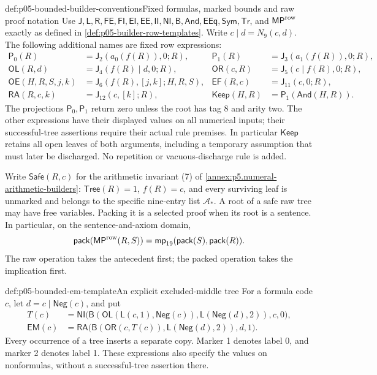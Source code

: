 \begin{hbdefinition}{def:p05-bounded-builder-conventions}{Fixed formulas, marked bounds and raw proof notation}
Use \(\mathsf J,\mathsf L,\mathsf R,\mathsf{FE},\mathsf{FI},
\mathsf{EI},\mathsf{EE},\mathsf{II},\mathsf{NI},\mathsf B,
\mathsf{And},\mathsf{EEq},\mathsf{Sym},\mathsf{Tr}\), and
\(\mathsf{MP}^{\rm row}\) exactly as defined in
\cref{def:p05-builder-row-templates}. Write \(c\mathbin{|}d=N_9(c,d)\).
The following additional names are fixed row expressions:
\[
\begin{aligned}
 \mathsf{P}_0(R)&=\mathsf J_2(a_0(f(R)),0;R),&
 \mathsf{P}_1(R)&=\mathsf J_3(a_1(f(R)),0;R),\\
 \mathsf{OL}(R,d)&=\mathsf J_4(f(R)\mathbin{|}d,0;R),&
 \mathsf{OR}(c,R)&=\mathsf J_5(c\mathbin{|}f(R),0;R),\\
 \mathsf{OE}(H,R,S,j,k)&=\mathsf J_6(f(R),[j,k];H,R,S),&
 \mathsf{EF}(R,c)&=\mathsf J_{11}(c,0;R),\\
 \mathsf{RA}(R,c,k)&=\mathsf J_{12}(c,[k];R),&
 \mathsf{Keep}(H,R)&=\mathsf P_1(\mathsf{And}(H,R)).
\end{aligned}
\]
The projections \(\mathsf P_0,\mathsf P_1\) return zero unless the root
has tag 8 and arity two. The other expressions have their displayed values
on all numerical inputs; their successful-tree assertions require their
actual rule premises. In particular \(\mathsf{Keep}\) retains all open
leaves of both arguments, including a temporary assumption that must later
be discharged. No repetition or vacuous-discharge rule is added.

Write \(\mathsf{Safe}(R,c)\) for the arithmetic invariant (7) of
\cref{annex:p5.numeral-arithmetic-builders}: \(\mathsf{Tree}(R)=1\),
\(f(R)=c\), and every surviving leaf is unmarked and belongs to the
specific nine-entry list \(\mathcal A_*\). A root of a safe raw tree may
have free variables. Packing it is a selected proof when its root is a
sentence. In particular, on the sentence-and-axiom domain,
\[
 \mathsf{pack}(\mathsf{MP}^{\rm row}(R,S))
       =\mathsf{mp}_{19}(\mathsf{pack}(S),\mathsf{pack}(R)).
\]
The raw operation takes the antecedent first; the packed operation takes the
implication first.
\end{hbdefinition}

\begin{hbdefinition}{def:p05-bounded-em-template}{An explicit excluded-middle tree}
For a formula code \(c\), let \(d=c\mathbin{|}\mathsf{Neg}(c)\), and put
\[
\begin{aligned}
 T(c)&=\mathsf{NI}\bigl(
   \mathsf B(\mathsf{OL}(\mathsf L(c,1),\mathsf{Neg}(c)),
                    \mathsf L(\mathsf{Neg}(d),2)),c,0\bigr),\\
 \mathsf{EM}(c)&=\mathsf{RA}\bigl(
   \mathsf B(\mathsf{OR}(c,T(c)),\mathsf L(\mathsf{Neg}(d),2)),d,1\bigr).
\end{aligned}
\]
Every occurrence of a tree inserts a separate copy. Marker 1 denotes label
0, and marker 2 denotes label 1. These expressions also specify the values
on nonformulas, without a successful-tree assertion there.
\end{hbdefinition}

